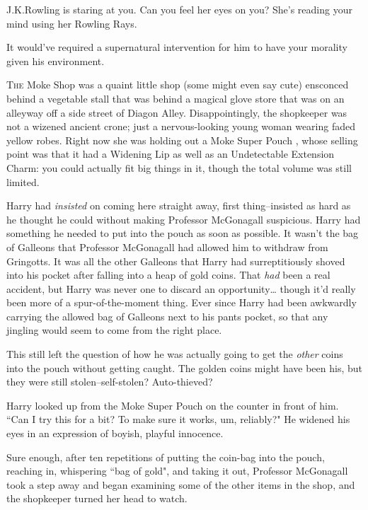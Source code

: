 
\begin{chapterOpeningAuthorNote}
J.\?K.\?Rowling is staring at you. Can you feel her eyes on you? She's reading your mind using her Rowling Rays.
\end{chapterOpeningAuthorNote}
\begin{chapterOpeningQuote}
It would've required a supernatural intervention for him to have your morality given his environment.
\end{chapterOpeningQuote}

\lettrine{T}{he} Moke Shop was a quaint little shop (some might even say cute) ensconced behind a vegetable stall that was behind a magical glove store that was on an alleyway off a side street of Diagon Alley. Disappointingly, the shopkeeper was not a wizened ancient crone; just a nervous-looking young woman wearing faded yellow robes. Right now she was holding out a Moke Super Pouch , whose selling point was that it had a Widening Lip as well as an Undetectable Extension Charm: you could actually fit big things in it, though the total volume was still limited.

Harry had \emph{insisted} on coming here straight away, first thing\---insisted as hard as he thought he could without making Professor McGonagall suspicious. Harry had something he needed to put into the pouch as soon as possible. It wasn't the bag of Galleons that Professor McGonagall had allowed him to withdraw from Gringotts. It was all the other Galleons that Harry had surreptitiously shoved into his pocket after falling into a heap of gold coins. That \emph{had} been a real accident, but Harry was never one to discard an opportunity{\ldots} though it'd really been more of a spur-of-the-moment thing. Ever since Harry had been awkwardly carrying the allowed bag of Galleons next to his pants pocket, so that any jingling would seem to come from the right place.

This still left the question of how he was actually going to get the \emph{other} coins into the pouch without getting caught. The golden coins might have been his, but they were still stolen\---self-stolen? Auto-thieved?

Harry looked up from the Moke Super Pouch  on the counter in front of him. ``Can I try this for a bit? To make sure it works, um, reliably?" He widened his eyes in an expression of boyish, playful innocence.

Sure enough, after ten repetitions of putting the coin-bag into the pouch, reaching in, whispering ``bag of gold", and taking it out, Professor McGonagall took a step away and began examining some of the other items in the shop, and the shopkeeper turned her head to watch.

